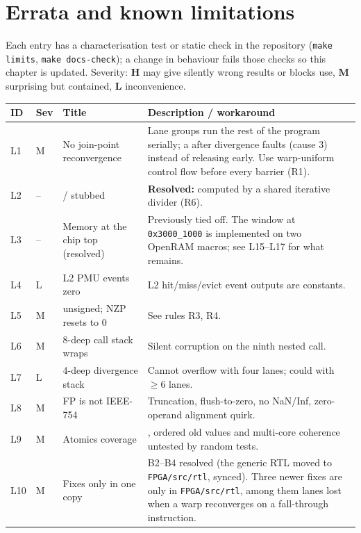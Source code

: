 \documentclass[10pt,a4paper]{report}
\newcommand{\ins}[1]{\texttt{\detokenize{#1}}}
\newcommand{\rowcol}{\rowcolors{2}{rowgray}{white}}
\newcommand{\tblhead}[1]{\cellcolor{hdrgray}\sffamily\bfseries #1}
\begin{document}
\chapter{Errata and known limitations}\label{ch:errata}
Each entry has a characterisation test or static check in the repository (\texttt{make limits}, \texttt{make docs-check}); a change in behaviour fails those checks so this chapter is updated.
Severity: \textbf{H} may give silently wrong results or blocks use, \textbf{M} surprising but contained, \textbf{L} inconvenience.
\rowcol
\begin{longtable}{@{}llp{3.7cm}p{9.2cm}@{}}
\tblhead{ID} & \tblhead{Sev} & \tblhead{Title} & \tblhead{Description / workaround}\\\endhead
L1 & M & No join-point reconvergence & Lane groups run the rest of the program serially; a \ins{SYNC} after divergence faults (cause 3) instead of releasing early. Use warp-uniform control flow before every barrier (R1).\\
L2 & -- & \ins{DIV}/\ins{MOD} stubbed & \textbf{Resolved:} computed by a shared iterative divider (R6).\\
L3 & -- & Memory at the chip top (resolved) & Previously tied off. The window at \texttt{0x3000\_1000} is implemented on two OpenRAM macros; see L15--L17 for what remains.\\
L4 & L & L2 PMU events zero & L2 hit/miss/evict event outputs are constants.\\
L5 & M & \ins{CMP} unsigned; NZP resets to 0 & See rules R3, R4.\\
L6 & M & 8-deep call stack wraps & Silent corruption on the ninth nested call.\\
L7 & L & 4-deep divergence stack & Cannot overflow with four lanes; could with $\ge6$ lanes.\\
L8 & M & FP is not IEEE-754 & Truncation, flush-to-zero, no NaN/Inf, zero-operand alignment quirk.\\
L9 & M & Atomics coverage & \ins{ATOM_CAS}, ordered old values and multi-core coherence untested by random tests.\\
L10 & M & Fixes only in one copy & B2--B4 resolved (the generic RTL moved to \texttt{FPGA/src/rtl}, synced). Three newer fixes are only in \texttt{FPGA/src/rtl}, among them lanes lost when a warp reconverges on a fall-through instruction.\\

\end{longtable}
\end{document}
